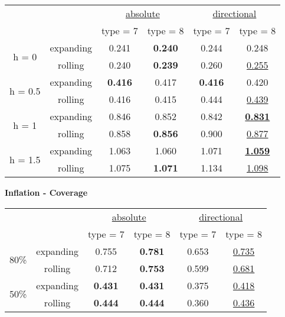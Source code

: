 \documentclass{article}
\begin{document}
\begin{center}
\begin{tabular}{ cccc c  c  } 

&&\multicolumn{2}{c}{\underline{absolute}}&\multicolumn{2}{c}{\underline{directional}}\\
 && type = 7  & type = 8 & type = 7 & type = 8\\[0.8em]
\multirow{2}{4em}{h = 0} &expanding & 0.241  &  \textbf{0.240}  &0.244  & 0.248 \\ 
&rolling & 0.240   & \textbf{0.239}  &0.260  & \underline{0.255}\\[0.5em]
\multirow{2}{4em}{h = 0.5} &expanding & \textbf{0.416}   & 0.417  &\textbf{0.416}  & 0.420 \\ 
&rolling & 0.416  & 0.415  & 0.444 & \underline{0.439} \\[0.5em]
\multirow{2}{4em}{h = 1} &expanding & 0.846   & 0.852  &0.842  & \underline{\textbf{0.831}} \\ 
&rolling & 0.858  & \textbf{0.856}  &0.900  & \underline{0.877} \\[0.5em]
\multirow{2}{4em}{h = 1.5} &expanding & 1.063   & 1.060  &1.071  & \underline{\textbf{1.059}} \\ 
&rolling & 1.075   & \textbf{1.071}  &1.134  & \underline{1.098} 
\end{tabular}
\end{center}
\newpage
\noindent
\Large{\textbf{Inflation - Coverage}}\bigskip
\normalsize
\begin{center}
\begin{tabular}{ cccc c  c  } 

&&\multicolumn{2}{c}{\underline{absolute}}&\multicolumn{2}{c}{\underline{directional}}\\
 && type = 7 & type = 8 & type = 7 & type = 8\\[0.8em]
\multirow{2}{4em}{80\%} &expanding & 0.755 & \textbf{0.781} & 0.653 & \underline{0.735}\\ 
&rolling & 0.712  & \textbf{0.753} & 0.599 & \underline{0.681}\\[0.5em]
\multirow{2}{4em}{50\%} &expanding & \textbf{0.431}& \textbf{0.431}  & 0.375 & \underline{0.418}\\ 
&rolling & \textbf{0.444} & \textbf{0.444} &0.360 &\underline{0.436}\\[0.5em]

\end{tabular}
\end{center}
\vspace{2cm}
\end{document}
